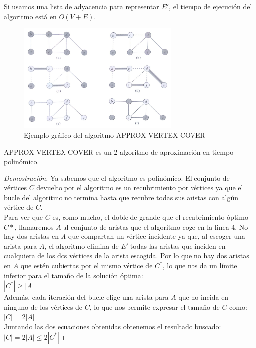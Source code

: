 \documentclass{article}
\begin{document}
Si usamos una lista de adyacencia para representar $E'$, el tiempo de ejecuci\'on del algoritmo está en $O(V + E)$.\\

\begin{figure}[H]
  \centering
    \includegraphics[width=0.7\textwidth]{vertex-cover}
  \caption{Ejemplo gráfico del algoritmo APPROX-VERTEX-COVER}
\end{figure}

\begin{thr}
APPROX-VERTEX-COVER es un 2-algoritmo de aproximaci\'on en tiempo polin\'omico.
\end{thr}
\begin{proof}[Demostración]
Ya sabemos que el algoritmo es polinómico. El conjunto de vértices $C$ devuelto por el algoritmo es un recubrimiento por vértices ya que el bucle del algoritmo no termina hasta que recubre todas sus aristas con algún vértice de $C$.\\ 
Para ver que $C$ es, como mucho, el doble de grande que el recubrimiento óptimo $C*$, llamaremos $A$ al conjunto de aristas que el algoritmo coge en la linea $4$. No hay dos aristas en $A$ que compartan un vértice incidente ya que, al escoger una arista para $A$, el algoritmo elimina de $E'$ todas las aristas que inciden en cualquiera de los dos vértices de la arista escogida. Por lo que no hay dos aristas en $A$ que estén cubiertas por el mismo vértice de $C^{*}$, lo que nos da un límite inferior para el tamaño de la solución óptima:\\
$|C^{*}| \geq |A|$\\
Además, cada iteración del bucle elige una arista para $A$ que no incida en ninguno de los vértices de $C$, lo que nos permite expresar el tamaño de $C$ como:\\
$|C| = 2|A|$\\
Juntando las dos ecuaciones obtenidas obtenemos el resultado buscado:\\
$|C| = 2|A| \leq 2|C^{*}|$ 	
\end{proof}
\end{document}
